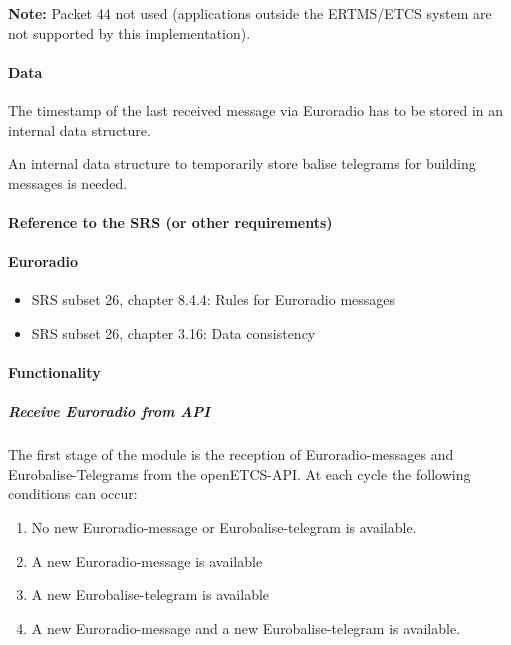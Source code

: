 \documentclass{template/openetcs_report}
\begin{document}

\textbf{Note:} Packet 44 not used (applications outside the ERTMS/ETCS system are not supported by this implementation).


\paragraph{Data}
The timestamp of the last received message via Euroradio has to be stored in an internal data structure.

An internal data structure to temporarily store balise telegrams for building messages is needed.

\paragraph{Reference to the SRS (or other requirements)}

\paragraph{Euroradio}
\begin{itemize}
 \item SRS subset 26, chapter 8.4.4: Rules for Euroradio messages
 \item SRS subset 26, chapter 3.16: Data consistency
\end{itemize}


\paragraph{Functionality}

\subparagraph{Receive Euroradio from API}
The first stage of the module is the reception of Euroradio-messages and Eurobalise-Telegrams from the openETCS-API. At each cycle the following conditions can occur:
\begin{enumerate}
 \item No new Euroradio-message or Eurobalise-telegram is available.
 \item A new Euroradio-message is available
 \item A new Eurobalise-telegram is available
 \item A new Euroradio-message and a new Eurobalise-telegram is available.
\end{enumerate}
\end{document}

